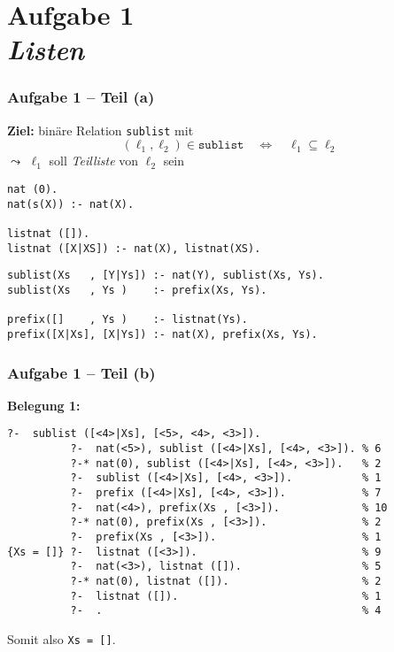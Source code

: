\documentclass{beamer}
\begin{document}
\section{Aufgabe 1 \\ \itshape \normalsize Listen}

\begin{frame}[fragile] \frametitle{Aufgabe 1 -- Teil (a)}
	\footnotesize
	
	\textbf{Ziel:} binäre Relation \texttt{sublist} mit 
	\begin{equation*}
		(\ell_1 , \ell_2) \in \texttt{sublist} 
		\quad \Leftrightarrow \quad
		\ell_1 \subseteq \ell_2
	\end{equation*}
	$\leadsto$ $\ell_1$ soll \textit{Teilliste} von $\ell_2$ sein
	
	\begin{lstlisting}
nat (0).
nat(s(X)) :- nat(X).

listnat ([]).
listnat ([X|XS]) :- nat(X), listnat(XS).

	\end{lstlisting}
	\pause
	\begin{lstlisting}[firstnumber=6]
sublist(Xs   , [Y|Ys]) :- nat(Y), sublist(Xs, Ys). 
sublist(Xs   , Ys )    :- prefix(Xs, Ys). 

prefix([]    , Ys )    :- listnat(Ys). 
prefix([X|Xs], [X|Ys]) :- nat(X), prefix(Xs, Ys).
	\end{lstlisting}
\end{frame}

\begin{frame}[fragile] \frametitle{Aufgabe 1 -- Teil (b)}
	\footnotesize
	\textbf{Belegung 1:}
	
	\begin{lstlisting}[style=refutation, basicstyle=\ttfamily\scriptsize]
          ?-  sublist ([<4>|Xs], [<5>, <4>, <3>]).
          ?-  nat(<5>), sublist ([<4>|Xs], [<4>, <3>]). % 6
          ?-* nat(0), sublist ([<4>|Xs], [<4>, <3>]).   % 2
          ?-  sublist ([<4>|Xs], [<4>, <3>]).           % 1
          ?-  prefix ([<4>|Xs], [<4>, <3>]).            % 7
          ?-  nat(<4>), prefix(Xs , [<3>]).             % 10
          ?-* nat(0), prefix(Xs , [<3>]).               % 2
          ?-  prefix(Xs , [<3>]).                       % 1
{Xs = []} ?-  listnat ([<3>]).                          % 9
          ?-  nat(<3>), listnat ([]).                   % 5
          ?-* nat(0), listnat ([]).                     % 2
          ?-  listnat ([]).                             % 1
          ?-  .                                         % 4
	\end{lstlisting}
	Somit also \texttt{Xs = []}.
\end{frame}
\end{document}
